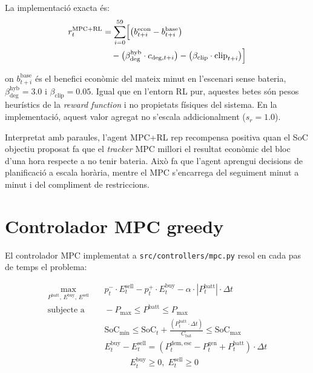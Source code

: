 \documentclass[a4paper,12pt,twoside]{ThesisStyle}
\begin{document}
La implementació exacta és:
\begin{align}
  r_t^{\mathrm{MPC+RL}} &= \sum_{i=0}^{59} \Bigl[\bigl(b_{t+i}^{\mathrm{econ}} - b_{t+i}^{\mathrm{base}}\bigr) \nonumber \\
  &\quad - \bigl(\beta_{\mathrm{deg}}^{\mathrm{hyb}} \cdot c_{\mathrm{deg},t+i}\bigr) - \bigl(\beta_{\mathrm{clip}} \cdot \mathrm{clip}_{t+i}\bigr)\Bigr]
  \label{eq:recompensa_mpcrl}
\end{align}

on $b_{t+i}^{\mathrm{base}}$ és el benefici econòmic del mateix minut en l'escenari sense bateria, $\beta_{\mathrm{deg}}^{\mathrm{hyb}} = 3.0$ i $\beta_{\mathrm{clip}} = 0.05$. Igual que en l'entorn RL pur, aquestes betes són pesos heurístics de la \textit{reward function} i no propietats físiques del sistema. En la implementació, aquest valor agregat no s'escala addicionalment ($s_r = 1.0$).

Interpretat amb paraules, l'agent MPC+RL rep recompensa positiva quan el SoC objectiu proposat fa que el \textit{tracker} MPC millori el resultat econòmic del bloc d'una hora respecte a no tenir bateria. Això fa que l'agent aprengui decisions de planificació a escala horària, mentre el MPC s'encarrega del seguiment minut a minut i del compliment de restriccions.

\section{Controlador MPC greedy}

El controlador MPC implementat a \texttt{src/controllers/mpc.py} resol en cada pas de temps el problema:

\begin{align}
  \max_{P^{\mathrm{batt}},\,E^{\mathrm{buy}},\,E^{\mathrm{sell}}} & \quad p_t^- \cdot E_t^{\mathrm{sell}} - p_t^+ \cdot E_t^{\mathrm{buy}} - \alpha \cdot |P_t^{\mathrm{batt}}| \cdot \Delta t \\
    \text{subjecte a} & \quad -P_{\max} \leq P^{\mathrm{batt}} \leq P_{\max} \\
  & \quad \mathrm{SoC}_{\min} \leq \mathrm{SoC}_t + \frac{\left(P_t^{\mathrm{batt}} \cdot \Delta t\right)}{C_{\mathrm{bat}}} \leq \mathrm{SoC}_{\max} \\
  & \quad E_t^{\mathrm{buy}} - E_t^{\mathrm{sell}} = \left(P_t^{\mathrm{dem,esc}} - P_t^{\mathrm{gen}} + P_t^{\mathrm{batt}}\right) \cdot \Delta t \nonumber \\
  & \hspace{4em} E_t^{\mathrm{buy}} \geq 0,\; E_t^{\mathrm{sell}} \geq 0
\end{align}
\end{document}
